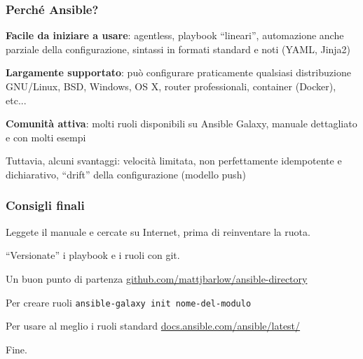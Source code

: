 \documentclass{beamer}
\begin{document}
\begin{frame}
\frametitle{Perché Ansible?}

\textbf{Facile da iniziare a usare}: agentless, playbook ``lineari'', automazione anche parziale della configurazione, sintassi in formati standard e noti (YAML, Jinja2)

\textbf{Largamente supportato}: può configurare praticamente qualsiasi distribuzione GNU/Linux, BSD, Windows, OS X, router professionali, container (Docker), etc...

\textbf{Comunità attiva}: molti ruoli disponibili su Ansible Galaxy, manuale dettagliato e con molti esempi

Tuttavia, alcuni svantaggi: velocità limitata, non perfettamente idempotente e dichiarativo, ``drift'' della configurazione (modello push)

\end{frame}

\begin{frame}
\frametitle{Consigli finali}

Leggete il manuale e cercate su Internet, prima di reinventare la ruota.

``Versionate'' i playbook e i ruoli con git.

\vspace{1em}

\begin{alertblock}{Un buon punto di partenza}
	\href{https://github.com/mattjbarlow/ansible-directory}{github.com/mattjbarlow/ansible-directory}
\end{alertblock}

\begin{alertblock}{Per creare ruoli}
	\texttt{ansible-galaxy init nome-del-modulo}
\end{alertblock}

\begin{alertblock}{Per usare al meglio i ruoli standard}
	\href{https://docs.ansible.com/ansible/latest/}{docs.ansible.com/ansible/latest/}
\end{alertblock}

\end{frame}

\begin{frame}

Fine.

\end{frame}

\end{document}
